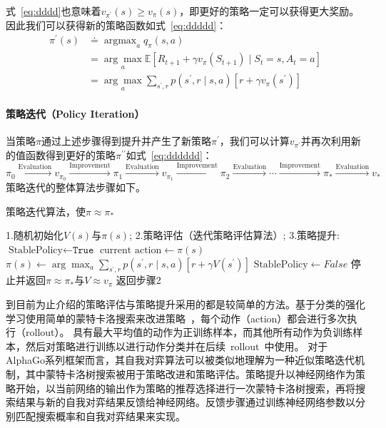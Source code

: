 式~\ref{eq:dddd}也意味着$v_{\pi^{\prime}}(s) \geq v_{\pi}(s)$，即更好的策略一定可以获得更大奖励。因此我们可以获得新的策略函数如式~\ref{eq:ddddd}：
\begin{equation}
  \begin{aligned}
  \pi^{\prime}(s) & \doteq \mathop{\arg \max }_a q_{\pi}(s, a) \\
  &=\underset{a}{\arg \max } \mathbb{E}\left[R_{t+1}+\gamma v_{\pi}\left(S_{t+1}\right) \mid S_{t}=s, A_{t}=a\right] \\
  &=\underset{a}{\arg \max } \sum_{s^{\prime}, r} p\left(s^{\prime}, r \mid s, a\right)\left[r+\gamma v_{\pi}\left(s^{\prime}\right)\right]
  \end{aligned}
  \label{eq:ddddd}
\end{equation}

\paragraph{策略迭代（Policy Iteration）}
当策略$\pi$通过上述步骤得到提升并产生了新策略$\pi^{\prime}$，我们可以计算$v_{\pi^{\prime}}$并再次利用新的值函数得到更好的策略$\pi^{\prime\prime}$如式~\ref{eq:dddddd}：
\begin{equation}
  \pi_{0} \stackrel{\mathrm{Evaluation}}{\longrightarrow} v_{\pi_{0}} \stackrel{\mathrm{Improvement}}{\longrightarrow} \pi_{1} \stackrel{\mathrm{Evaluation}}{\longrightarrow} v_{\pi_{1}} \stackrel{\mathrm{Improvement}}{\longrightarrow} \pi_{2} \stackrel{\mathrm{Evaluation}}{\longrightarrow} \cdots \stackrel{\mathrm{Improvement}}{\longrightarrow} \pi_{*} \stackrel{\mathrm{Evaluation}}{\longrightarrow} v_{*}
  \label{eq:dddddd}
\end{equation}
策略迭代的整体算法步骤如下。
\begin{algorithm}[H]
  \caption{策略迭代算法，使$\pi \approx \pi_{*} $}
  \begin{algorithmic}
    \State 1.随机初始化$V(s)$与$\pi(s)$;
    \State 2.策略评估（迭代策略评估算法）;
    \State 3.策略提升:
    \State $\text{StablePolicy} \leftarrow \texttt{True}$
    \State $\text{current action}\leftarrow\pi(s)$
    \State $\pi(s) \leftarrow \arg \max _{a} \sum_{s^{\prime}, r} p\left(s^{\prime}, r \mid s, a\right)\left[r+\gamma V\left(s^{\prime}\right)\right]$
        \State $\text{StablePolicy} \leftarrow False$
    \EndIf
    \EndFor
    \State 停止并返回$\pi \approx \pi_{*} $与$V\approx v_{\pi} $
    \Else 
    \State 返回步骤2
    \EndIf
  \end{algorithmic}
\end{algorithm}
到目前为止介绍的策略评估与策略提升采用的都是较简单的方法。基于分类的强化学习使用简单的蒙特卡洛搜索来改进策略~\cite{RLC}，每个动作（action）都会进行多次执行（rollout）。 具有最大平均值的动作为正训练样本，而其他所有动作为负训练样本，然后对策略进行训练以进行动作分类并在后续~rollout~中使用。
对于AlphaGo系列框架而言，其自我对弈算法可以被类似地理解为一种近似策略迭代机制，其中蒙特卡洛树搜索被用于策略改进和策略评估。策略提升以神经网络作为策略开始，以当前网络的输出作为策略的推荐选择进行一次蒙特卡洛树搜索，再将搜索结果与新的自我对弈结果反馈给神经网络。反馈步骤通过训练神经网络参数以分别匹配搜索概率和自我对弈结果来实现。
